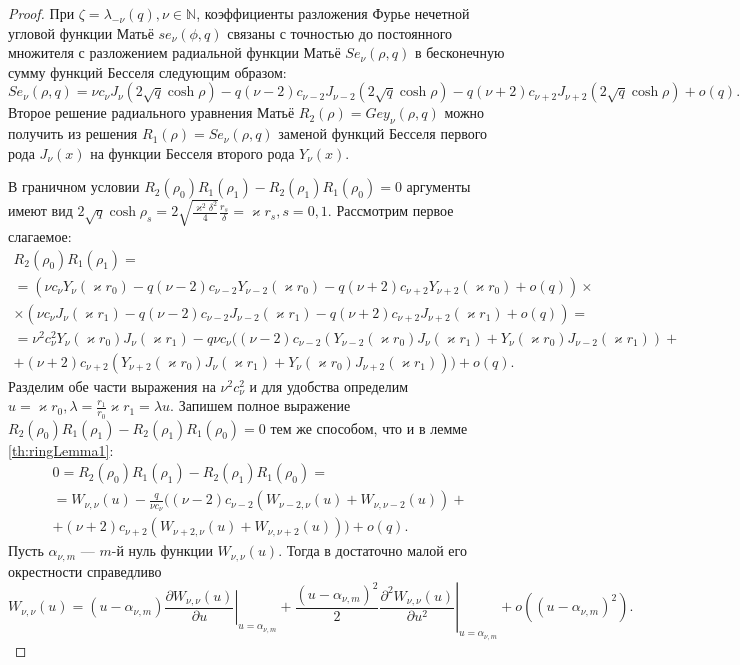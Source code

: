 \begin{proof}
При $\zeta = \lambda_{-\nu}(q), \nu \in \mathbb{N}$, коэффициенты разложения Фурье нечетной угловой функции Матьё $se_\nu(\phi, q)$ связаны \cite{wref2} с точностью до постоянного множителя с разложением радиальной функции Матьё $Se_\nu(\rho, q)$ в бесконечную сумму функций Бесселя следующим образом:
{\small
\[
Se_\nu(\rho, q) = 
	\nu c_\nu J_\nu(2\sqrt{q}\cosh{\rho})  -
	q (\nu-2) c_{\nu-2} J_{\nu-2}(2\sqrt{q}\cosh{\rho}) - 
	q (\nu+2) c_{\nu+2} J_{\nu+2}(2\sqrt{q}\cosh{\rho}) + o(q).
\]
}
Второе решение радиального уравнения Матьё $R_2(\rho)=Gey_\nu(\rho, q)$ можно получить из решения $R_1(\rho)=Se_\nu(\rho, q)$ заменой функций Бесселя первого рода $J_\nu(x)$ на функции Бесселя второго рода $Y_\nu(x)$.

В граничном условии $R_2(\rho_0) R_1(\rho_1) - R_2(\rho_1) R_1(\rho_0) = 0$ аргументы имеют вид $2 \sqrt{q} \cosh{\rho_s} = 2 \sqrt{\frac{\varkappa^2 \delta^2}{4}} \frac{r_s}{\delta} = \varkappa r_s, s=0,1$. Рассмотрим первое слагаемое:
{\small
\begin{multline*}
	R_2(\rho_0) R_1(\rho_1) = \\
=\left(
\nu c_\nu Y_\nu(\varkappa r_0) - 
	q (\nu-2) c_{\nu-2} Y_{\nu-2}(\varkappa r_0) -
	q (\nu+2) c_{\nu+2} Y_{\nu+2}(\varkappa r_0) + o(q)
\right) \times \\
\times \left(
\nu c_\nu J_\nu(\varkappa r_1) - 
	q (\nu-2) c_{\nu-2} J_{\nu-2}(\varkappa r_1) -
	q (\nu+2) c_{\nu+2} J_{\nu+2}(\varkappa r_1) + o(q)
\right) = \\
= \nu^2 c_\nu^2 Y_\nu(\varkappa r_0)J_\nu(\varkappa r_1) - 
	q \nu c_\nu \bigg(   (\nu-2) c_{\nu-2} 
	\left(
	Y_{\nu-2}(\varkappa r_0)J_\nu(\varkappa r_1) +  Y_{\nu}(\varkappa r_0)J_{\nu-2}(\varkappa r_1)
	\right) +
	\\ +
	 (\nu+2) c_{\nu+2} 
	\left(
	Y_{\nu+2}(\varkappa r_0)J_\nu(\varkappa r_1) + Y_{\nu}(\varkappa r_0)J_{\nu+2}(\varkappa r_1)
	\right)
\bigg) + o(q).
\end{multline*}
}
Разделим обе части выражения на $\nu^2 c_\nu^2$ и для удобства определим $u = \varkappa r_0, \lambda = \frac{r_1}{r_0}  \varkappa r_1 = \lambda u$. Запишем полное выражение $R_2(\rho_0) R_1(\rho_1) - R_2(\rho_1) R_1(\rho_0) = 0$ тем же способом, что и в лемме \ref{th:ringLemma1}:
\begin{multline}
	0 = R_2(\rho_0) R_1(\rho_1) - R_2(\rho_1) R_1(\rho_0)  = \\
= W_{\nu, \nu}(u) - 
	\frac{q}{\nu c_\nu} \bigg(   (\nu-2) c_{\nu-2}
	\left(
	W_{\nu-2, \nu}(u) + W_{\nu, \nu-2}(u)
	\right)+ \\
	  + (\nu+2) c_{\nu+2}
	\left(
	W_{\nu+2, \nu}(u) + W_{\nu, \nu+2}(u)
	\right)
\bigg) + o(q).
\label{eq:35}
\end{multline}
Пусть $\alpha_{\nu, m}$ --- $m$-й нуль функции $W_{\nu, \nu}(u)$. Тогда в достаточно малой его окрестности справедливо
$$
W_{\nu, \nu}(u) = (u - \alpha_{\nu, m}) \left.
\frac{\partial W_{\nu, \nu}(u)}{\partial u}
\right|_{u=\alpha_{\nu, m}} + 
\frac{ (u - \alpha_{\nu, m})^2 }{2} \left.
\frac{\partial^2 W_{\nu, \nu}(u)}{\partial u^2}
\right|_{u=\alpha_{\nu, m}} + o((u - \alpha_{\nu, m})^2).
$$


\end{proof}
